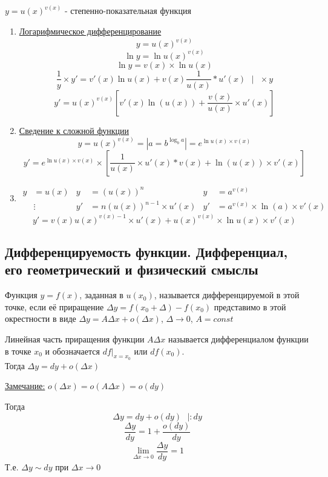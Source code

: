 \documentclass[12pt]{article}
\begin{document}
\begin{enumerate}
        $y = u(x)^{v(x)}$ - степенно-показательная функция
        \begin{enumerate}
            \item \underline{Логарифмическое дифференцирование}\\
            \[ y = u(x)^{v(x)} \]
            \[ \ln y = \ln u(x)^{v(x)} \]
            \[ \ln y = v(x) \times \ln u(x) \]
            \[ \frac{1}{y} \times y' = v'(x)\ln u(x) + v(x)\frac{1}{u(x)}*u'(x) \text{ } \big| \text{ } \times y \]
            \[ y' = u(x)^{v(x)}\left[v'(x)\ln(u(x)) + \frac{v(x)}{u(x)} \times u'(x)\right] \]
            \item \underline{Сведение к сложной функции}
            \[ y = u(x)^{v(x)} = \left|a = b^{\log_b a}\right| = e^{\ln u(x) \times v(x)} \]
            \[ y' = e^{\ln u(x) \times v(x)} \times \left[ \frac{1}{u(x)} \times u'(x)*v(x) + \ln(u(x)) \times v'(x) \right] \]
            \item \begin{align*}
                y &= u(x) & y &= (u(x))^n & y &= a^{v(x)}\\
                &\vdots & y' &= n(u(x))^{n-1} \times u'(x) & y' &= a^{v(x)} \times \ln(a) \times v'(x)
            \end{align*}
            \[ y' = v(x)u(x)^{v(x)-1} \times u'(x) + u(x)^{v(x)} \times \ln u(x) \times v'(x) \]
        \end{enumerate}
    \end{enumerate}

    \subsection{Дифференцируемость функции. Дифференциал, его геометрический и физический смыслы}\noindent
    Функция $y = f(x)$, заданная в $u(x_0)$, называется дифференцируемой в этой точке, если её приращение $\Delta y = f(x_0 + \Delta) - f(x_0)$ представимо в этой окрестности в виде $\Delta y = A\Delta x + o(\Delta x)$, $\Delta \to 0$, $A = const$\par\noindent
    Линейная часть приращения функции $A\Delta x $ называется дифференциалом функции в точке $x_0$ и обозначается $df\Big|_{x = x_0}$ или $df(x_0)$.\\
    Тогда $\Delta y = dy+o(\Delta x)$\par\noindent
    \underline{Замечание:} $o(\Delta x)=o(A\Delta x)=o(dy)$
    \begin{adjustwidth}{1.5em}{1.5em}
        Тогда
        \[\Delta y = dy + o(dy)\,\,\,\,\Big| : dy\]
        \[\frac{\Delta y}{dy}=1+\frac{o(dy)}{dy}\]
        \[\lim_{\Delta x \to 0}{\frac{\Delta y}{dy}}=1\]
        Т.е. $\Delta y \sim dy $ при $\Delta x \to 0$
    \end{adjustwidth}
\end{document}
